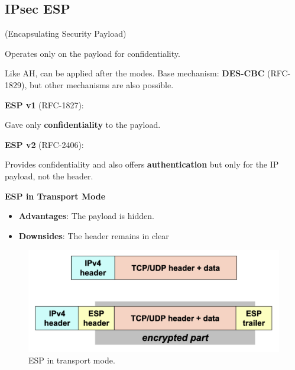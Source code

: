 \subsection{IPsec ESP}
\begin{center}
    (Encapsulating Security Payload)

    Operates only on the payload for confidentiality.
\end{center}
Like AH, can be applied after the modes. Base mechanism: \textbf{DES-CBC} (RFC-1829), but other mechanisms are also possible.

\begin{multicols}{2}
    \raggedcolumns
    \textbf{ESP v1} (RFC-1827):

    Gave only \textbf{confidentiality} to the payload.

\columnbreak

\textbf{ESP v2} (RFC-2406):

Provides confidentiality and also offers \textbf{authentication} but only for the IP payload, not the header.
\end{multicols}


\begin{center}
    \textbf{ESP in Transport Mode}
\end{center}


\begin{multicols}{2}
    \raggedcolumns
    \begin{itemize}
        \item \textbf{Advantages}: The payload is hidden.
        \item \textbf{Downsides}: The header remains in clear
    \end{itemize}

\columnbreak

\begin{figure}[H]
    \centering
  \includegraphics[width=\linewidth]{Images/NetSec/esp_transport_mode.png}
  \caption{ESP in transport mode.}
\end{figure}
\end{multicols}

